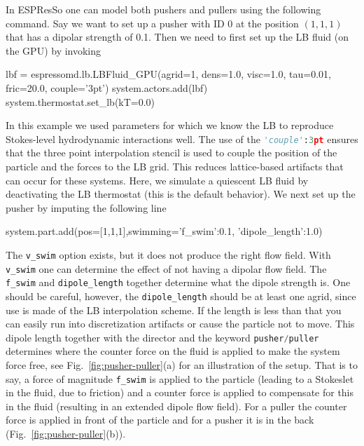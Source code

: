 \documentclass[aip,jcp,reprint,a4paper,onecolumn,amsmath]{revtex4-1}
\newcommand{\es}{\mbox{\textsf{ESPResSo}}\xspace}
\newcommand\codees{\lstinline[language=python]}
\begin{document}
In \es{} one can model both pushers and pullers using the following command. Say we want to set up a pusher with ID 0 at the position $(1,1,1)$ that has a dipolar strength of 0.1. Then we need to first set up the LB fluid (on the GPU) by invoking
\begin{espresso}
lbf = espressomd.lb.LBFluid_GPU(agrid=1, dens=1.0, visc=1.0, tau=0.01, fric=20.0, couple='3pt')
system.actors.add(lbf)
system.thermostat.set_lb(kT=0.0)
\end{espresso}
In this example we used parameters for which we know the LB to reproduce Stokes-level hydrodynamic interactions well. The use of the \codees{'couple':3pt} ensures that the three point interpolation stencil is used to couple the position of the particle and the forces to the LB grid. This reduces lattice-based artifacts that can occur for these systems. Here, we simulate a quiescent LB fluid by deactivating the LB thermostat (this is the default behavior). We next set up the pusher by imputing the following line
\begin{espresso}
system.part.add(pos=[1,1,1],swimming={'f_swim':0.1, 'dipole_length':1.0})
\end{espresso}
The \codees{v_swim} option exists, but it does not produce the right flow field. With \codees{v_swim} one can determine the effect of not having a dipolar flow field. The \codees{f_swim} and \codees{dipole_length} together determine what the dipole strength is. One should be careful, however, the \codees{dipole_length} should be at least one agrid, since use is made of the LB interpolation scheme. If the length is less than that you can easily run into discretization artifacts or cause the particle not to move. This dipole length together with the director and the keyword \codees{pusher/puller} determines where the counter force on the fluid is applied to make the system force free, see Fig.~\ref{fig:pusher-puller}(a) for an illustration of the setup. That is to say, a force of magnitude \codees{f_swim} is applied to the particle (leading to a Stokeslet in the fluid, due to friction) and a counter force is applied to compensate for this in the fluid (resulting in an extended dipole flow field). For a puller the counter force is applied in front of the particle and for a pusher it is in the back (Fig.~\ref{fig:pusher-puller}(b)).
\end{document}
